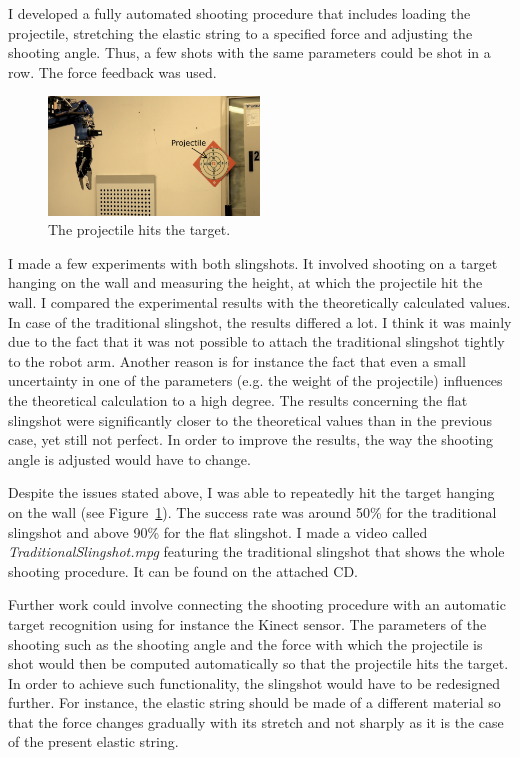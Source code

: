         I developed a fully automated shooting procedure that includes loading the projectile, stretching the elastic string to a specified force and adjusting the shooting angle. Thus, a few shots with the same parameters could be shot in a row. The force feedback was used.

        \begin{figure}[h]
        \includegraphics[width=0.5\textwidth]{Img/conclusion/HitTargetAdj.png}
        \centering
        \caption{The projectile hits the target.}
        \label{fig:HitTarget}
        \end{figure}

        I made a few experiments with both slingshots. It involved shooting on a target hanging on the wall and measuring the height, at which the projectile hit the wall. I compared the experimental results with the theoretically calculated values. In case of the traditional slingshot, the results differed a lot. I think it was mainly due to the fact that it was not possible to attach the traditional slingshot tightly to the robot arm. Another reason is for instance the fact that even a small uncertainty in one of the parameters (e.g. the weight of the projectile) influences the theoretical calculation to a high degree. The results concerning the flat slingshot were significantly closer to the theoretical values than in the previous case, yet still not perfect. In order to improve the results, the way the shooting angle is adjusted would have to change.

        Despite the issues stated above, I was able to repeatedly hit the target hanging on the wall (see Figure~\ref{fig:HitTarget}). The success rate was around 50\% for the traditional slingshot and above 90\% for the flat slingshot. I made a video called \textit{TraditionalSlingshot.mpg} featuring the traditional slingshot that shows the whole shooting procedure. It can be found on the attached CD.

        Further work could involve connecting the shooting procedure with an automatic target recognition using for instance the Kinect sensor. The parameters of the shooting such as the shooting angle and the force with which the projectile is shot would then be computed automatically so that the projectile hits the target. In order to achieve such functionality, the slingshot would have to be redesigned further. For instance, the elastic string should be made of a different material so that the force changes gradually with its stretch and not sharply as it is the case of the present elastic string.


